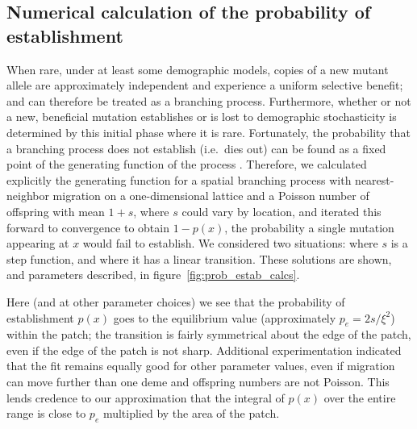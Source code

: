 \documentclass{article}
\newcommand{\citep}[1]{\cite{#1}}
\begin{document}
\subsection[Probability of Establishment]{Numerical calculation of the probability of establishment}
\label{apx:establishment_sims}

When rare, under at least some demographic models,
copies of a new mutant allele are approximately independent and experience a uniform selective benefit;
and can therefore be treated as a branching process.
Furthermore, whether or not a new, beneficial mutation establishes or is lost to demographic stochasticity
is determined by this initial phase where it is rare.
Fortunately, the probability that a branching process does not establish
(i.e.\ dies out)
can be found as a fixed point of the generating function of the process \citep{jagers1975branching}.
Therefore, we calculated explicitly the generating function for a spatial branching process
with nearest-neighbor migration on a one-dimensional lattice
and a Poisson number of offspring with mean $1+s$,
where $s$ could vary by location,
and iterated this forward to convergence to obtain $1-p(x)$, the probability a single mutation appearing at $x$ would fail to establish.
We considered two situations:
where $s$ is a step function,
and where it has a linear transition.
These solutions are shown, and parameters described, in figure~\ref{fig:prob_estab_calcs}.

Here (and at other parameter choices) we see that the probability of establishment $p(x)$ goes to the equilibrium value
(approximately $p_e = 2s/\xi^2$) within the patch;
the transition is fairly symmetrical about the edge of the patch, even if the edge of the patch is not sharp.
Additional experimentation indicated that the fit remains equally good for other parameter values,
even if migration can move further than one deme and offspring numbers are not Poisson.
This lends credence to our approximation that the integral of $p(x)$ over the entire range
is close to $p_e$ multiplied by the area of the patch.
\end{document}
